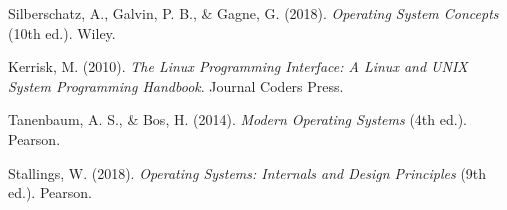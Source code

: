 \documentclass[12pt]{article}
\begin{document}
\begin{thebibliography}{9}

    Silberschatz, A., Galvin, P. B., \& Gagne, G. (2018). \textit{Operating System Concepts} (10th ed.). Wiley.
    
    Kerrisk, M. (2010). \textit{The Linux Programming Interface: A Linux and UNIX System Programming Handbook}. Journal Coders Press.
    
    Tanenbaum, A. S., \& Bos, H. (2014). \textit{Modern Operating Systems} (4th ed.). Pearson.
    
    Stallings, W. (2018). \textit{Operating Systems: Internals and Design Principles} (9th ed.). Pearson.
    
    \end{thebibliography}
\end{document}
